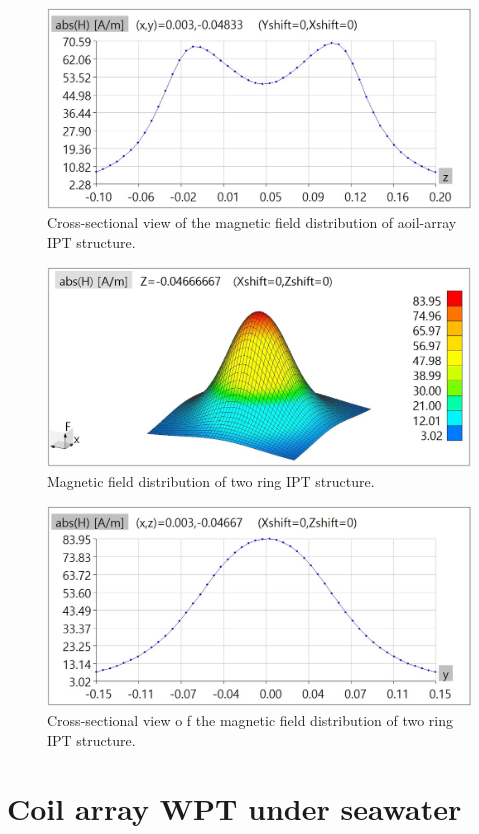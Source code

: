 \begin{figure}[!t]
    \centering
    \includegraphics[width=0.9\linewidth]{images/4_coil_array_near_field_distribution_cut.JPG}
    \caption{Cross-sectional view of the magnetic field distribution of aoil-array IPT structure.}
\end{figure}

\begin{figure}[!t]
    \centering
    \includegraphics[width=0.9\linewidth]{images/4_two_ring_near_field_distribution.JPG}
    \caption{Magnetic field distribution of two ring IPT structure.}
\end{figure}

\begin{figure}[!t]
    \centering
    \includegraphics[width=0.9\linewidth]{images/4_two_ring_near_field_distribution_cut.JPG}
    \caption{Cross-sectional view o f the magnetic field distribution of two ring IPT structure.}
\end{figure}



\section{Coil array WPT under seawater}

